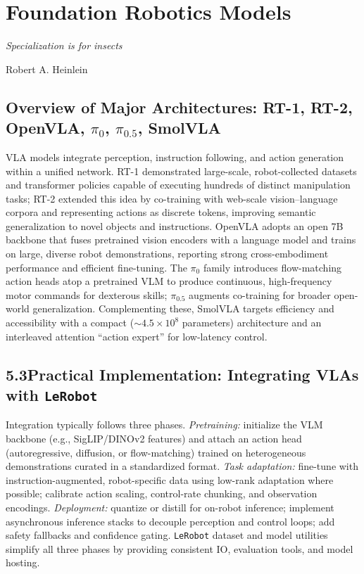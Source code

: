 \section{Foundation Robotics Models}
\label{sec:learning-bc-generalist}

\epigraph{\textit{Specialization is for insects}}{Robert A. Heinlein}

\subsection{Overview of Major Architectures: RT-1, RT-2, OpenVLA, $\pi_0$, $\pi_{0.5}$, SmolVLA}
VLA models integrate perception, instruction following, and action generation within a unified network. RT-1 demonstrated large-scale, robot-collected datasets and transformer policies capable of executing hundreds of distinct manipulation tasks; RT-2 extended this idea by co-training with web-scale vision–language corpora and representing actions as discrete tokens, improving semantic generalization to novel objects and instructions. OpenVLA adopts an open 7B backbone that fuses pretrained vision encoders with a language model and trains on large, diverse robot demonstrations, reporting strong cross-embodiment performance and efficient fine-tuning. The $\pi_0$ family introduces flow-matching action heads atop a pretrained VLM to produce continuous, high-frequency motor commands for dexterous skills; $\pi_{0.5}$ augments co-training for broader open-world generalization. Complementing these, SmolVLA targets efficiency and accessibility with a compact (\(\sim\!4.5\times10^8\) parameters) architecture and an interleaved attention ``action expert'' for low-latency control.

\subsection*{5.3\quad Practical Implementation: Integrating VLAs with \texttt{LeRobot}}
Integration typically follows three phases. \emph{Pretraining:} initialize the VLM backbone (e.g., SigLIP/DINOv2 features) and attach an action head (autoregressive, diffusion, or flow-matching) trained on heterogeneous demonstrations curated in a standardized format. \emph{Task adaptation:} fine-tune with instruction-augmented, robot-specific data using low-rank adaptation where possible; calibrate action scaling, control-rate chunking, and observation encodings. \emph{Deployment:} quantize or distill for on-robot inference; implement asynchronous inference stacks to decouple perception and control loops; add safety fallbacks and confidence gating. \texttt{LeRobot} dataset and model utilities simplify all three phases by providing consistent IO, evaluation tools, and model hosting.

